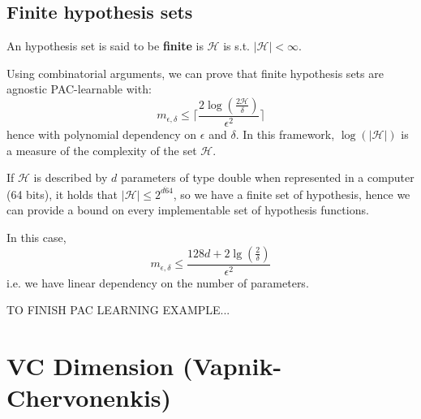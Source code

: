\subsection*{Finite hypothesis sets}

An hypothesis set is said to be \textbf{finite} is $\mathcal{H}$ is s.t. $|\mathcal{H}| < \infty$.

Using combinatorial arguments, we can prove that finite hypothesis sets are agnostic PAC-learnable with:
$$
m_{\epsilon, \delta} \leq \lceil \frac{2\log (\frac{2\mathcal{H}}{\delta})}{\epsilon^2} \rceil
$$
hence with polynomial dependency on $\epsilon$ and $\delta$. In this framework, $\log(|\mathcal{H}|)$ is a measure of the complexity of the set $\mathcal{H}$.
\begin{warningblock}
    If $\mathcal{H}$ is described by $d$ parameters of type double when represented in a computer (64 bits), it holds that $|\mathcal{H}| \leq 2^{d\dot 64}$, so we have a finite set of hypothesis, hence we can provide a bound on every implementable set of hypothesis functions.

    In this case,
    $$
    m_{\epsilon, \delta} \leq \frac{128d + 2\lg(\frac{2}{\delta})}{\epsilon^2}
    $$
    i.e. we have linear dependency on the number of parameters.
\end{warningblock}

TO FINISH PAC LEARNING EXAMPLE...




\section{VC Dimension (Vapnik-Chervonenkis)}






